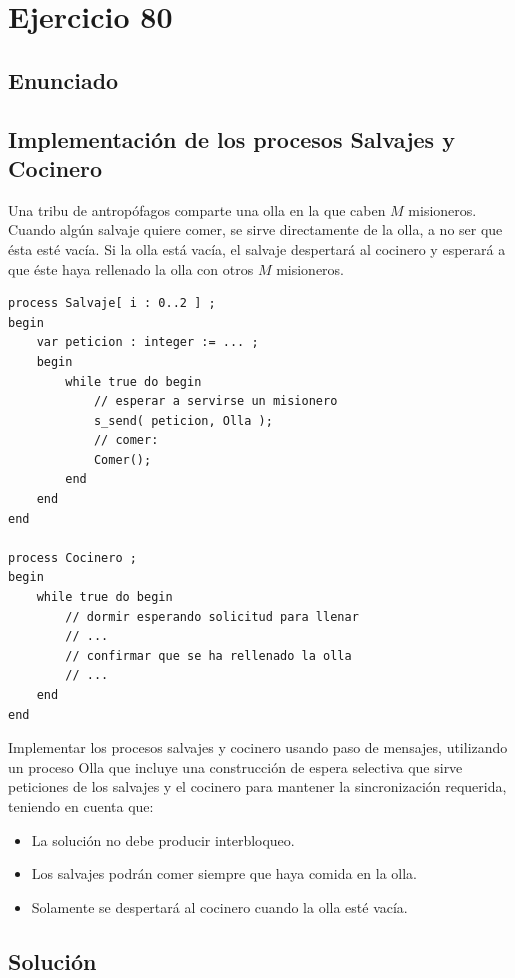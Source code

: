 \documentclass[a4paper,12pt]{article}
\begin{document}
\section{Ejercicio 80}

\subsection{Enunciado}

\subsection*{Implementación de los procesos Salvajes y Cocinero}

Una tribu de antropófagos comparte una olla en la que caben \(M\) misioneros. Cuando algún salvaje quiere comer, se sirve directamente de la olla, a no ser que ésta esté vacía. Si la olla está vacía, el salvaje despertará al cocinero y esperará a que éste haya rellenado la olla con otros \(M\) misioneros.

\begin{lstlisting}[style=customcpp]
process Salvaje[ i : 0..2 ] ;
begin
    var peticion : integer := ... ;
    begin
        while true do begin
            // esperar a servirse un misionero
            s_send( peticion, Olla );
            // comer:
            Comer();
        end
    end
end

process Cocinero ;
begin 
    while true do begin
        // dormir esperando solicitud para llenar
        // ...
        // confirmar que se ha rellenado la olla
        // ...
    end
end
\end{lstlisting}

Implementar los procesos salvajes y cocinero usando paso de mensajes, utilizando un proceso Olla que incluye una construcción de espera selectiva que sirve peticiones de los salvajes y el cocinero para mantener la sincronización requerida, teniendo en cuenta que:

\begin{itemize}
    \item La solución no debe producir interbloqueo.
    \item Los salvajes podrán comer siempre que haya comida en la olla.
    \item Solamente se despertará al cocinero cuando la olla esté vacía.
\end{itemize}

\subsection{Solución}
\end{document}
